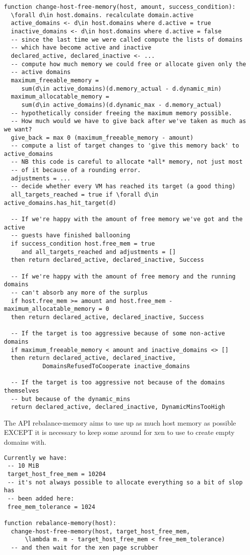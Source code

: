 \begin{verbatim}
function change-host-free-memory(host, amount, success_condition):
  \forall d\in host.domains. recalculate domain.active
  active_domains <- d\in host.domains where d.active = true
  inactive_domains <- d\in host.domains where d.active = false
  -- since the last time we were called compute the lists of domains 
  -- which have become active and inactive
  declared_active, declared_inactive <- ...
  -- compute how much memory we could free or allocate given only the 
  -- active domains
  maximum_freeable_memory = 
     sum(d\in active_domains)(d.memory_actual - d.dynamic_min)
  maximum_allocatable_memory = 
     sum(d\in active_domains)(d.dynamic_max - d.memory_actual)
  -- hypothetically consider freeing the maximum memory possible. 
  -- How much would we have to give back after we've taken as much as we want?
  give_back = max 0 (maximum_freeable_memory - amount)
  -- compute a list of target changes to 'give this memory back' to active_domains
  -- NB this code is careful to allocate *all* memory, not just most 
  -- of it because of a rounding error.
  adjustments = ...
  -- decide whether every VM has reached its target (a good thing)
  all_targets_reached = true if \forall d\in active_domains.has_hit_target(d)
  
  -- If we're happy with the amount of free memory we've got and the active 
  -- guests have finished ballooning
  if success_condition host.free_mem = true 
     and all_targets_reached and adjustments = []
  then return declared_active, declared_inactive, Success
  
  -- If we're happy with the amount of free memory and the running domains 
  -- can't absorb any more of the surplus
  if host.free_mem >= amount and host.free_mem - maximum_allocatable_memory = 0
  then return declared_active, declared_inactive, Success

  -- If the target is too aggressive because of some non-active domains
  if maximum_freeable_memory < amount and inactive_domains <> []
  then return declared_active, declared_inactive, 
           DomainsRefusedToCooperate inactive_domains

  -- If the target is too aggressive not because of the domains themselves 
  -- but because of the dynamic_mins
  return declared_active, declared_inactive, DynamicMinsTooHigh
\end{verbatim}

The API rebalance-memory aims to use up as much host memory as possible EXCEPT it is necessary to keep some around
for xen to use to create empty domains with.

\begin{verbatim}
Currently we have:
 -- 10 MiB
 target_host_free_mem = 10204
 -- it's not always possible to allocate everything so a bit of slop has 
 -- been added here:
 free_mem_tolerance = 1024

function rebalance-memory(host):
  change-host-free-memory(host, target_host_free_mem, 
      \lambda m. m - target_host_free_mem < free_mem_tolerance)
  -- and then wait for the xen page scrubber
\end{verbatim}
